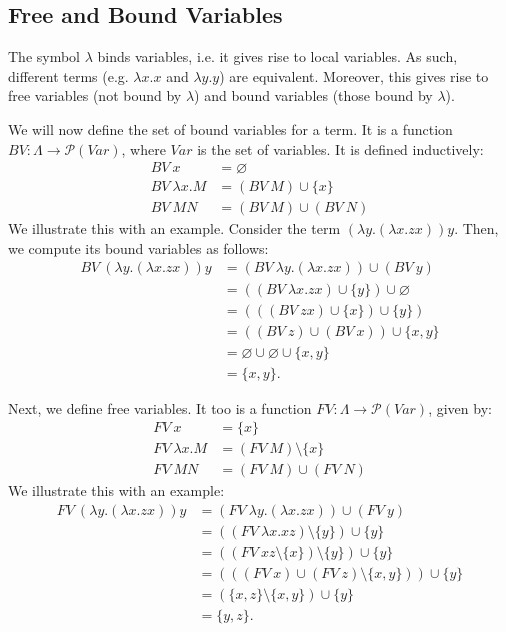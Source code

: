 \documentclass[a4paper, openany]{memoir}
\theoremstyle{definition}
\begin{document}
    \subsection{Free and Bound Variables}
    The symbol $\lambda$ binds variables, i.e. it gives rise to local variables. As such, different terms (e.g. $\lambda x. x$ and $\lambda y. y$) are equivalent. Moreover, this gives rise to free variables (not bound by $\lambda$) and bound variables (those bound by $\lambda$).

    We will now define the set of bound variables for a term. It is a function $BV \colon \Lambda \to \mathcal{P}(Var)$, where $Var$ is the set of variables. It is defined inductively:
    \begin{align*}
        BV \ x &= \varnothing \\
        BV \ \lambda x. M &= (BV \ M) \cup \{x\} \\
        BV \ MN &= (BV \ M) \cup (BV \ N)
    \end{align*}
    We illustrate this with an example. Consider the term $(\lambda y. (\lambda x. zx)) y$. Then, we compute its bound variables as follows:
    \begin{align*}
        BV \ (\lambda y. (\lambda x. zx)) y &= (BV \ \lambda y. (\lambda x. zx)) \cup (BV \ y) \\
        &= ((BV \ \lambda x.zx) \cup \{y\}) \cup \varnothing \\
        &= (((BV \ zx) \cup \{x\}) \cup \{y\}) \\
        &= ((BV \ z) \cup (BV \ x)) \cup \{x, y\} \\
        &= \varnothing \cup \varnothing \cup \{x, y\} \\
        &= \{x, y\}.
    \end{align*}

    Next, we define free variables. It too is a function $FV \colon \Lambda \to \mathcal{P}(Var)$, given by:
    \begin{align*}
        FV \ x &= \{x\} \\
        FV \ \lambda x. M &= (FV \ M) \setminus \{x\} \\
        FV \ MN &= (FV \ M) \cup (FV \ N)
    \end{align*}
    We illustrate this with an example:
    \begin{align*}
        FV \ (\lambda y. (\lambda x. zx)) y &= (FV \ \lambda y.(\lambda x. zx)) \cup (FV \ y) \\
        &= ((FV \ \lambda x.xz) \setminus \{y\}) \cup \{y\} \\
        &= ((FV \ xz \setminus \{x\}) \setminus \{y\}) \cup \{y\} \\
        &= (((FV \ x) \cup (FV \ z) \setminus \{x, y\})) \cup \{y\} \\
        &= (\{x, z\} \setminus \{x, y\}) \cup \{y\} \\
        &= \{y, z\}.
    \end{align*}
\end{document}

